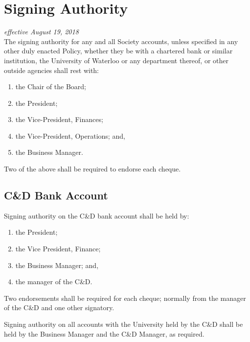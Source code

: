 \section{Signing Authority}
\emph{effective August 19, 2018}\\

The signing authority for any and all Society accounts, unless specified in any
other duly enacted Policy, whether they be with a chartered bank or similar
institution, the University of Waterloo or any department thereof, or other
outside agencies shall rest with:

\begin{enumerate}
    \item the Chair of the Board;
    \item the President;
    \item the Vice-President, Finances;
    \item the Vice-President, Operations; and,
    \item the Business Manager.
\end{enumerate}

Two of the above shall be required to endorse each cheque.

\subsection{C\&D Bank Account}
Signing authority on the C\&D bank account shall be held by:

\begin{enumerate}
    \item the President;
    \item the Vice President, Finance; 
    \item the Business Manager; and,
    \item the manager of the C\&D. 
\end{enumerate}

Two endorsements shall be required for each cheque; normally from the manager 
of the C\&D and one other signatory. 

Signing authority on all accounts with the University held by the C\&D shall
be held by the Business Manager and the C\&D Manager, as required.
